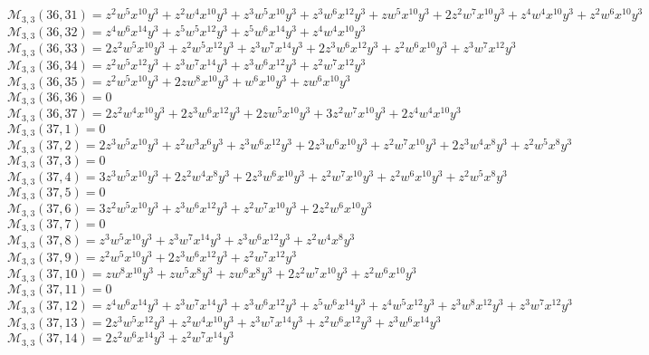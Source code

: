 \documentclass[12pt]{memoireuqam1.3}
\begin{document}
$\mathcal{M}_{3,3}(36,31)=z^2w^5x^{10}y^3+z^2w^4x^{10}y^3+z^3w^5x^{10}y^3+z^3w^6x^{12}y^3+zw^5x^{10}y^3+2z^2w^7x^{10}y^3+z^4w^4x^{10}y^3+z^2w^6x^{10}y^3$\\
$\mathcal{M}_{3,3}(36,32)=z^4w^6x^{14}y^3+z^5w^5x^{12}y^3+z^5w^6x^{14}y^3+z^4w^4x^{10}y^3$\\
$\mathcal{M}_{3,3}(36,33)=2z^2w^5x^{10}y^3+z^2w^5x^{12}y^3+z^3w^7x^{14}y^3+2z^3w^6x^{12}y^3+z^2w^6x^{10}y^3+z^3w^7x^{12}y^3$\\
$\mathcal{M}_{3,3}(36,34)=z^2w^5x^{12}y^3+z^3w^7x^{14}y^3+z^3w^6x^{12}y^3+z^2w^7x^{12}y^3$\\
$\mathcal{M}_{3,3}(36,35)=z^2w^5x^{10}y^3+2zw^8x^{10}y^3+w^6x^{10}y^3+zw^6x^{10}y^3$\\
$\mathcal{M}_{3,3}(36,36)=0$\\
$\mathcal{M}_{3,3}(36,37)=2z^2w^4x^{10}y^3+2z^3w^6x^{12}y^3+2zw^5x^{10}y^3+3z^2w^7x^{10}y^3+2z^4w^4x^{10}y^3$\\
$\mathcal{M}_{3,3}(37,1)=0$\\
$\mathcal{M}_{3,3}(37,2)=2z^3w^5x^{10}y^3+z^2w^3x^6y^3+z^3w^6x^{12}y^3+2z^3w^6x^{10}y^3+z^2w^7x^{10}y^3+2z^3w^4x^8y^3+z^2w^5x^8y^3$\\
$\mathcal{M}_{3,3}(37,3)=0$\\
$\mathcal{M}_{3,3}(37,4)=3z^3w^5x^{10}y^3+2z^2w^4x^8y^3+2z^3w^6x^{10}y^3+z^2w^7x^{10}y^3+z^2w^6x^{10}y^3+z^2w^5x^8y^3$\\
$\mathcal{M}_{3,3}(37,5)=0$\\
$\mathcal{M}_{3,3}(37,6)=3z^2w^5x^{10}y^3+z^3w^6x^{12}y^3+z^2w^7x^{10}y^3+2z^2w^6x^{10}y^3$\\
$\mathcal{M}_{3,3}(37,7)=0$\\
$\mathcal{M}_{3,3}(37,8)=z^3w^5x^{10}y^3+z^3w^7x^{14}y^3+z^3w^6x^{12}y^3+z^2w^4x^8y^3$\\
$\mathcal{M}_{3,3}(37,9)=z^2w^5x^{10}y^3+2z^3w^6x^{12}y^3+z^2w^7x^{12}y^3$\\
$\mathcal{M}_{3,3}(37,10)=zw^8x^{10}y^3+zw^5x^8y^3+zw^6x^8y^3+2z^2w^7x^{10}y^3+z^2w^6x^{10}y^3$\\
$\mathcal{M}_{3,3}(37,11)=0$\\
$\mathcal{M}_{3,3}(37,12)=z^4w^6x^{14}y^3+z^3w^7x^{14}y^3+z^3w^6x^{12}y^3+z^5w^6x^{14}y^3+z^4w^5x^{12}y^3+z^3w^8x^{12}y^3+z^3w^7x^{12}y^3$\\
$\mathcal{M}_{3,3}(37,13)=2z^3w^5x^{12}y^3+z^2w^4x^{10}y^3+z^3w^7x^{14}y^3+z^2w^6x^{12}y^3+z^3w^6x^{14}y^3$\\
$\mathcal{M}_{3,3}(37,14)=2z^2w^6x^{14}y^3+z^2w^7x^{14}y^3$\\
\end{document}
